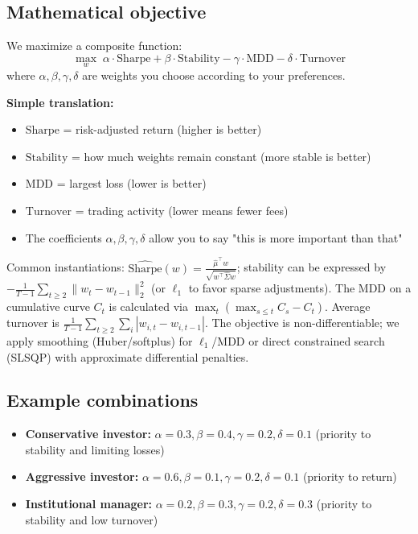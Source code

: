 \documentclass[11pt,a4paper]{article}
\begin{document}
\subsection{Mathematical objective}
We maximize a composite function:
\[\max_w \; \alpha \cdot \text{Sharpe} + \beta \cdot \text{Stability} - \gamma \cdot \text{MDD} - \delta \cdot \text{Turnover}\]
where \(\alpha, \beta, \gamma, \delta\) are weights you choose according to your preferences.

\textbf{Simple translation:} 
\begin{itemize}
\item \(\text{Sharpe}\) = risk-adjusted return (higher is better)
\item \(\text{Stability}\) = how much weights remain constant (more stable is better)
\item \(\text{MDD}\) = largest loss (lower is better)
\item \(\text{Turnover}\) = trading activity (lower means fewer fees)
\item The coefficients \(\alpha, \beta, \gamma, \delta\) allow you to say "this is more important than that"
\end{itemize}
\noindent Common instantiations: \(\widehat{\text{Sharpe}}(w)=\frac{\hat\mu^\top w}{\sqrt{w^\top \hat\Sigma w}}\); stability can be expressed by \(-\frac{1}{T-1}\sum_{t\ge 2}\lVert w_t-w_{t-1}\rVert_2^2\) (or \(\ell_1\) to favor sparse adjustments). The \(\text{MDD}\) on a cumulative curve \(C_t\) is calculated via \(\max_t (\max_{s\le t} C_s - C_t)\). Average turnover is \(\frac{1}{T-1}\sum_{t\ge 2}\sum_i |w_{i,t}-w_{i,t-1}|\). The objective is non-differentiable; we apply smoothing (Huber/softplus) for \(\ell_1\)/MDD or direct constrained search (SLSQP) with approximate differential penalties.

\subsection{Example combinations}
\begin{itemize}
\item \textbf{Conservative investor:} \(\alpha=0.3, \beta=0.4, \gamma=0.2, \delta=0.1\) (priority to stability and limiting losses)
\item \textbf{Aggressive investor:} \(\alpha=0.6, \beta=0.1, \gamma=0.2, \delta=0.1\) (priority to return)
\item \textbf{Institutional manager:} \(\alpha=0.2, \beta=0.3, \gamma=0.2, \delta=0.3\) (priority to stability and low turnover)
\end{itemize}
\end{document}
